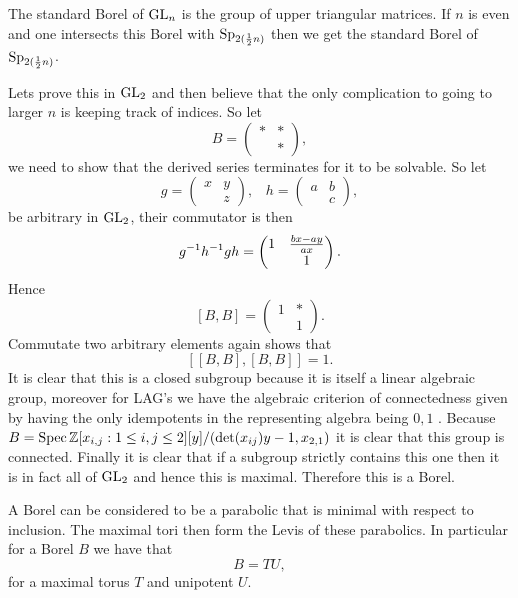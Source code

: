    \begin{example}
        The standard Borel of \(\operatorname{GL}_n\) is the group of upper triangular matrices. If \(n\) is even and one intersects this Borel with \(\operatorname{Sp}_{2(\frac{1}{2}n)}\) then we get the standard Borel of \(\operatorname{Sp}_{2(\frac{1}{2}n)}\).

        Lets prove this in \(\operatorname{GL}_2\) and then believe that the only complication to going to larger \(n\) is keeping track of indices. So let 
        \[B = \begin{pmatrix}
            \ast & \ast \\
             & \ast
        \end{pmatrix},\]
        we need to show that the derived series terminates for it to be solvable. So let 
        \[g = \begin{pmatrix}
            x & y\\
             & z
        \end{pmatrix}, \;\;\; h = \begin{pmatrix}
            a & b \\
            & c
        \end{pmatrix},\]
        be arbitrary in \(\operatorname{GL}_2\), their commutator is then 
        \[g^{-1} h^{-1} gh =  \begin{pmatrix}
            1 & \frac{bx - ay}{ax} \\ & 1
        \end{pmatrix} .\]
        Hence
        \[[B, B] = \begin{pmatrix}
            1 & \ast \\ & 1
        \end{pmatrix}.\]
        Commutate two arbitrary elements again shows that  
        \[[[B, B], [B, B]] = 1.\]
    It is clear that this is a closed subgroup because it is itself a linear algebraic group, moreover for LAG's we have the algebraic criterion of connectedness given by having the only idempotents in the representing algebra being \(0, 1\) \cite[1.5]{getzIntroductionAutomorphicRepresentations2024}. Because \(B = \Spec \Z[x_{i,j}: 1\leq i,j\leq 2][y] / (\det(x_{ij})y - 1, x_{2,1})\) it is clear that this group is connected.     
    Finally it is clear that if a subgroup strictly contains this one then it is in fact all of \(\operatorname{GL}_2\) and hence this is maximal. Therefore this is a Borel.
    \end{example}
        
    A Borel can be considered to be a parabolic that is minimal with respect to inclusion. The maximal tori then form the Levis of these parabolics. In particular for a Borel \(B\) we have that 
    \[B = TU,\]
    for a maximal torus \(T\) and unipotent \(U\).


